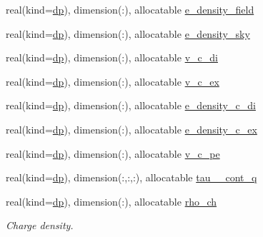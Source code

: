 \begin{DoxyCompactItemize}
\item 
real(kind=\mbox{\hyperlink{namespaceparameters_a52f8c6351fd79345d8811e065bcbbb37}{dp}}), dimension(\+:), allocatable \mbox{\hyperlink{group__OTHER__DENSITIES_gadb82cb07fdaadb4c3d4fc703ec7d0f32}{e\+\_\+density\+\_\+field}}
\item 
real(kind=\mbox{\hyperlink{namespaceparameters_a52f8c6351fd79345d8811e065bcbbb37}{dp}}), dimension(\+:), allocatable \mbox{\hyperlink{group__OTHER__DENSITIES_ga899215cff7de8d505ca9437a2c7a9e5d}{e\+\_\+density\+\_\+sky}}
\item 
real(kind=\mbox{\hyperlink{namespaceparameters_a52f8c6351fd79345d8811e065bcbbb37}{dp}}), dimension(\+:), allocatable \mbox{\hyperlink{group__OTHER__DENSITIES_ga7503ebd6515d35346e8989c0ace67040}{v\+\_\+c\+\_\+di}}
\item 
real(kind=\mbox{\hyperlink{namespaceparameters_a52f8c6351fd79345d8811e065bcbbb37}{dp}}), dimension(\+:), allocatable \mbox{\hyperlink{group__OTHER__DENSITIES_ga9fa9512dcae76285fafca5bf94f6d548}{v\+\_\+c\+\_\+ex}}
\item 
real(kind=\mbox{\hyperlink{namespaceparameters_a52f8c6351fd79345d8811e065bcbbb37}{dp}}), dimension(\+:), allocatable \mbox{\hyperlink{group__OTHER__DENSITIES_ga87dbb79a5a923879327d170ac2dd0554}{e\+\_\+density\+\_\+c\+\_\+di}}
\item 
real(kind=\mbox{\hyperlink{namespaceparameters_a52f8c6351fd79345d8811e065bcbbb37}{dp}}), dimension(\+:), allocatable \mbox{\hyperlink{group__OTHER__DENSITIES_gae0cdcff4839ee5f5e753521c6110a58c}{e\+\_\+density\+\_\+c\+\_\+ex}}
\item 
real(kind=\mbox{\hyperlink{namespaceparameters_a52f8c6351fd79345d8811e065bcbbb37}{dp}}), dimension(\+:), allocatable \mbox{\hyperlink{group__OTHER__DENSITIES_ga2ace64338ba159caa9b44094efffa81d}{v\+\_\+c\+\_\+pe}}
\item 
real(kind=\mbox{\hyperlink{namespaceparameters_a52f8c6351fd79345d8811e065bcbbb37}{dp}}), dimension(\+:,\+:,\+:), allocatable \mbox{\hyperlink{group__OTHER__DENSITIES_gae767b94dc83914662f299fc87eeaf623}{tau\+\_\+\_\+cont\+\_\+q}}
\item 
real(kind=\mbox{\hyperlink{namespaceparameters_a52f8c6351fd79345d8811e065bcbbb37}{dp}}), dimension(\+:), allocatable \mbox{\hyperlink{group__OTHER__DENSITIES_ga06ab0886762c00b75dd1adf55f9e61a0}{rho\+\_\+ch}}
\begin{DoxyCompactList}\small\item\em Charge density. \end{DoxyCompactList}\item 

\end{DoxyCompactItemize}
